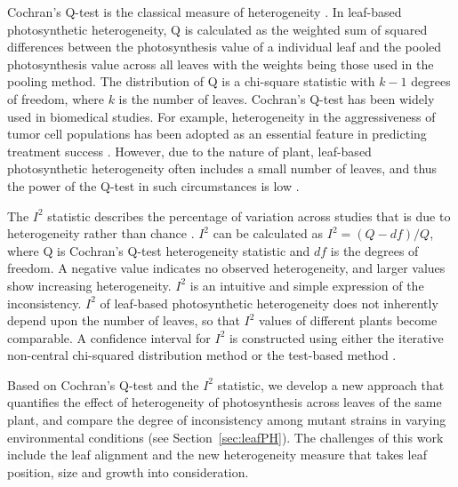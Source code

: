 {Cochran's Q-test is the classical measure of heterogeneity \cite{conover1999Practical}. In leaf-based photosynthetic heterogeneity, Q is calculated as the weighted sum of squared differences between the photosynthesis value of a individual leaf and the pooled photosynthesis value across all leaves with the weights being those used in the pooling method. The distribution of Q is a chi-square statistic with $k-1$ degrees of freedom, where $k$ is the number of leaves. Cochran's Q-test has been widely used in biomedical studies. For example, heterogeneity in the aggressiveness of tumor cell populations has been adopted as an essential feature in predicting treatment success \cite{OSullivan2003}. However, due to the nature of plant, leaf-based photosynthetic heterogeneity often includes a small number of leaves, and thus the power of the Q-test in such circumstances is low \cite{higgins2003measuring, gavaghan2000evaluation}.
%


The $I^2$ statistic describes the percentage of variation across studies that is due to heterogeneity rather than chance \cite{higgins2002quantifying,higgins2003measuring}. $I^2$ can be calculated  as $I^2 = (Q - df)/Q$, where Q is Cochran's Q-test heterogeneity statistic and $df$ is the degrees of freedom. A negative value  indicates no observed heterogeneity, and larger values show increasing heterogeneity. $I^2$ is an intuitive and simple expression of the inconsistency. $I^2$ of leaf-based photosynthetic heterogeneity does not inherently depend upon the number of leaves, so that $I^2$ values of different plants become comparable. A confidence interval for $I^2$ is constructed using either the iterative non-central chi-squared distribution method \cite{hedges2001power} or the test-based method \cite{higgins2002quantifying}.

Based on Cochran's Q-test and the $I^2$ statistic, we develop a new approach that quantifies the effect of heterogeneity of photosynthesis across leaves of the same plant, and compare the degree of inconsistency among mutant strains in varying environmental conditions (see Section~\ref{sec:leafPH}). The challenges of this work include the leaf alignment and the new heterogeneity measure that takes leaf position, size and growth into consideration.

}
